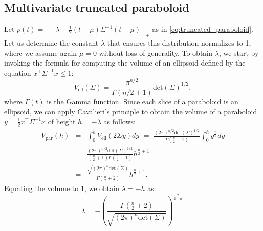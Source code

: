 \documentclass{article}
\newcommand{\remove}[1]{}
\begin{document}
\remove{
The Gini negentropy of this distribution is
\begin{eqnarray}
\Omega_2(\hat{p}_{\Omega_2}[f]) &=& -\frac{1}{2} + \frac{1}{2}\int \hat{p}^2_{\Omega_2}[f](x)\nonumber\\
&=& -\frac{1}{2} + \frac{1}{2}\int_{-a}^a \left(-\lambda - \frac{x^2}{2\sigma^2}\right)^2\nonumber\\
&=& -\frac{1}{2} - \lambda^2 a + \frac{\lambda a^3}{3\sigma^2} + \frac{a^5}{20\sigma^4}\nonumber\\
&=& -\frac{1}{2} + \frac{a^5}{4\sigma^4} - \frac{a^5}{6\sigma^4} + \frac{a^5}{20\sigma^4}\nonumber\\
&=& -\frac{1}{2} + \frac{2a^5}{15\sigma^4}\nonumber\\
&=& -\frac{1}{2} + \frac{1}{5}\left(\frac{3}{2\sigma}\right)^{2/3}.
\end{eqnarray}
}

\subsection{Multivariate truncated paraboloid}\label{sec:proof_truncated_paraboloid}

Let $p(t) = \left[-\lambda - \frac{1}{2}(t-\mu)\Sigma^{-1}(t-\mu)\right]_+$ as in \eqref{eq:truncated_paraboloid}.
Let us determine the constant $\lambda$ that ensures this distribution normalizes to 1, where we assume again $\mu=0$ without loss of generality. To obtain $\lambda$, we start by invoking the formula for computing the volume of an ellipsoid defined
by the equation $x^\top \Sigma^{-1} x \le 1$:
\begin{equation}
V_{\mathrm{ell}}(\Sigma) = \frac{\pi^{n/2}}{\Gamma(n/2 + 1)} \mathrm{det}(\Sigma)^{1/2},
\end{equation}
where $\Gamma(t)$ is the Gamma function.
Since each slice of a paraboloid is an ellipsoid, we can apply Cavalieri's principle to obtain the volume of a paraboloid $y=\frac{1}{2} x^\top \Sigma^{-1} x$ of height $h = -\lambda$ as follows:
\begin{eqnarray}
V_{\mathrm{par}}(h) &=& \int_{0}^{h} V_{\mathrm{ell}}(2 \Sigma y)dy 
\,\,=\,\, \frac{(2\pi)^{n/2}\mathrm{det}(\Sigma)^{1/2}}{\Gamma(\frac{n}{2} + 1)}  \int_{0}^{h} y^{\frac{n}{2}}dy\nonumber\\ 
&=& \frac{(2\pi)^{n/2}\mathrm{det}(\Sigma)^{1/2}}{(\frac{n}{2} + 1)\Gamma(\frac{n}{2} + 1)}  h^{\frac{n}{2}+1}\nonumber\\
&=& \frac{\sqrt{(2\pi)^{n}\mathrm{det}(\Sigma)}}{\Gamma(\frac{n}{2} + 2)}  h^{\frac{n}{2}+1}.
\end{eqnarray}
Equating the volume to 1, we obtain $\lambda = -h$ as:
\begin{equation}
\lambda = -\left(\frac{\Gamma(\frac{n}{2} + 2)}{\sqrt{(2\pi)^{n}\mathrm{det}(\Sigma)}}\right)^{\frac{2}{2+n}}.
\end{equation}
\end{document}
